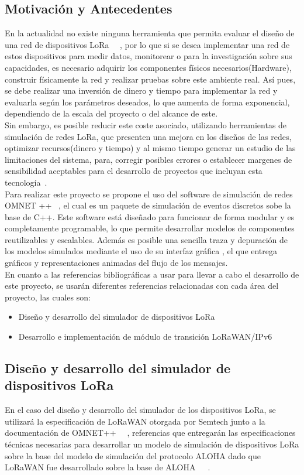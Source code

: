 \begin{justify}
\section{Motivación y Antecedentes}
En la actualidad no existe ninguna herramienta que permita evaluar el diseño de una red de dispositivos LoRa ~\cite{Sornin}~\cite{Sornin2}, por lo que si se desea implementar una red de estos dispositivos para medir datos, monitorear o para la investigación sobre sus capacidades, es necesario adquirir los componentes físicos necesarios(Hardware), construir físicamente la red y realizar pruebas sobre este ambiente real. Así pues, se debe realizar una inversión de dinero y tiempo para implementar la red y evaluarla según los parámetros deseados, lo que aumenta de forma exponencial, dependiendo de la escala del proyecto o del alcance de este.\\
Sin embargo, es posible reducir este coste asociado, utilizando herramientas de simulación de redes LoRa, que presenten una mejora en los diseños de las redes, optimizar recursos(dinero y tiempo) y al mismo tiempo generar un estudio de las limitaciones del sistema, para, corregir posibles errores o establecer margenes de sensibilidad aceptables para el desarrollo de proyectos que incluyan esta tecnología~\cite{Xavier}.\\ 
Para realizar este proyecto se propone el uso del software de simulación de redes OMNET ++ ~\cite{Omnet++}, el cual es un paquete de simulación de eventos discretos sobe la base de C++. Este software está diseñado para funcionar de forma modular y es completamente programable, lo que permite desarrollar modelos de componentes reutilizables y escalables. Además es posible una sencilla traza y depuración de los modelos simulados mediante el uso de su interfaz gráfica , el que entrega gráficos y representaciones animadas del flujo de los mensajes.\\

En cuanto a las referencias bibliográficas a usar para llevar a cabo el desarrollo de este proyecto, se usarán diferentes referencias relacionadas con cada área del proyecto, las cuales son: 
\begin{itemize}
\item Diseño y desarrollo del simulador de dispositivos LoRa
\item Desarrollo e implementación de módulo de transición LoRaWAN/IPv6
\end{itemize}
\subsection{Diseño y desarrollo del simulador de dispositivos LoRa}
En el caso del diseño y desarrollo del simulador de los dispositivos LoRa, se utilizará la especificación de LoRaWAN otorgada por Semtech junto a la documentación de OMNET++ ~\cite{Sornin}~\cite{Sornin2}, referencias que entregarán las especificaciones técnicas necesarias para  desarrollar un modelo de simulación de dispositivos LoRa sobre la base del modelo de simulación del protocolo ALOHA dado que  LoRaWAN fue desarrollado sobre la base de ALOHA~\cite{Sornin}~\cite{Abdullah}~\cite{NORMAN}. 

\end{justify}
